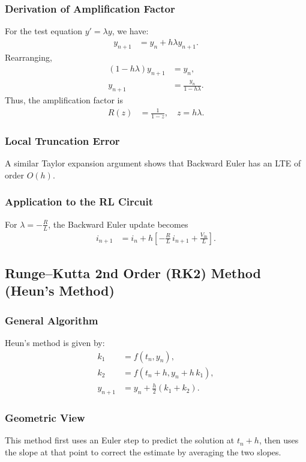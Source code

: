 \documentclass[12pt]{article}
\begin{document}
\subsubsection*{Derivation of Amplification Factor}
For the test equation $y'=\lambda y$, we have:
\begin{align}
y_{n+1} &= y_n + h\lambda y_{n+1}.
\end{align}
Rearranging,
\begin{align}
(1-h\lambda)y_{n+1} &= y_n, \\
y_{n+1} &= \frac{y_n}{1-h\lambda}.
\end{align}
Thus, the amplification factor is 
\begin{align}
R(z) &= \frac{1}{1-z}, \quad z=h\lambda.
\end{align}

\subsubsection*{Local Truncation Error}
A similar Taylor expansion argument shows that Backward Euler has an LTE of order $O(h)$.

\subsubsection*{Application to the RL Circuit}
For $\lambda=-\frac{R}{L}$, the Backward Euler update becomes 
\begin{align}
i_{n+1} &= i_n + h\left[-\frac{R}{L}\, i_{n+1}+\frac{V_{\text{in}}}{L}\right].
\end{align}

\subsection{Runge--Kutta 2nd Order (RK2) Method (Heun's Method)}
\subsubsection*{General Algorithm}
Heun's method is given by:
\begin{align}
k_1 &= f(t_n,y_n), \\
k_2 &= f(t_n+h, y_n+h\, k_1), \\
y_{n+1} &= y_n + \frac{h}{2}(k_1+k_2).
\end{align}

\subsubsection*{Geometric View}
This method first uses an Euler step to predict the solution at $t_n+h$, then uses the slope at that point to correct the estimate by averaging the two slopes.
\end{document}
